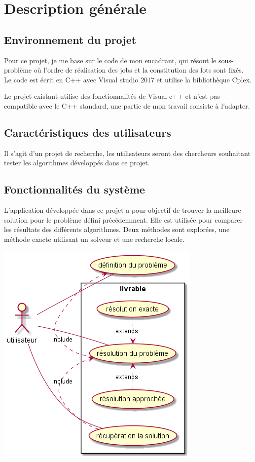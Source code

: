 \chapter{Description générale}

\section{Environnement du projet}
Pour ce projet, je me base sur le code de mon encadrant, qui résout le sous-problème où l'ordre de réalisation des jobs et la constitution des lots sont fixés.
Le code est écrit en C++ avec Visual studio 2017 et utilise la bibliothèque Cplex.

Le projet existant utilise des fonctionnalités de Visual c++ et n'est pas compatible avec le C++ standard,
 une partie de mon travail consiste à l'adapter.
\section{Caractéristiques des utilisateurs}
Il s'agit d'un projet de recherche, les utilisateurs seront des chercheurs souhaitant tester les algorithmes développés dans ce projet.
 
\section{Fonctionnalités du système}
L'application développée dans ce projet a pour objectif de trouver la meilleure solution pour le problème défini précédemment.
Elle est utilisée pour comparer les résultats des différents algorithmes.
Deux méthodes sont explorées, une méthode exacte utilisant un solveur et une recherche locale.

\includegraphics[width=\textwidth]{parts/description_generale/use_cases}

